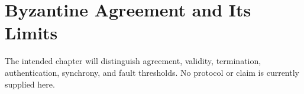 \chapter{Byzantine Agreement and Its Limits}
\label{chap:byzantine-agreement}


The intended chapter will distinguish agreement, validity, termination,
authentication, synchrony, and fault thresholds. No protocol or claim is
currently supplied here.
